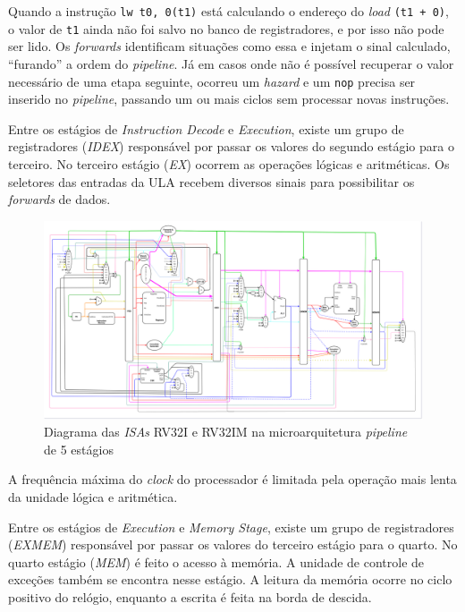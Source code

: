         { Quando a instrução \texttt{lw  t0, 0(t1)} está calculando o endereço
            do \textit{load} \texttt{(t1 + 0)}, o valor de \texttt{t1} ainda
            não foi salvo no banco de registradores, e por isso não pode ser
            lido. Os \textit{forwards} identificam situações como essa e injetam
            o sinal calculado, ``furando'' a ordem do \textit{pipeline}.
            Já em casos onde não é possível recuperar o valor necessário de uma
            etapa seguinte, ocorreu um \textit{hazard} e um \texttt{nop} precisa
            ser inserido no \textit{pipeline}, passando um ou mais ciclos sem
            processar novas instruções.
        }

        { Entre os estágios de \textit{Instruction Decode} e \textit{Execution},
            existe um grupo de registradores (\textit{IDEX}) responsável por passar
            os valores do segundo estágio para o terceiro. No terceiro estágio
            (\textit{EX}) ocorrem as operações lógicas e aritméticas.
            Os seletores das entradas da ULA recebem diversos sinais para
            possibilitar os \textit{forwards} de dados.
        }

        \begin{figure}[H]
        \centering
            \includegraphics[angle=90,width=1\textwidth,height=1\textheight,keepaspectratio]{../images/uarch_diagrams/pipeline-RV32I-RV32IM.png}
            \caption{Diagrama das \textit{ISAs} RV32I e RV32IM na microarquitetura
                \textit{pipeline} de 5 estágios}\label{fig:diagram_rv32i_pipe}
        \end{figure}

        { A frequência máxima do \textit{clock} do processador é limitada pela
            operação mais lenta da unidade lógica e aritmética.
        }

        { Entre os estágios de \textit{Execution} e \textit{Memory Stage},
            existe um grupo de registradores (\textit{EXMEM}) responsável por passar
            os valores do terceiro estágio para o quarto. No quarto estágio
            (\textit{MEM}) é feito o acesso à memória. A unidade
            de controle de exceções também se encontra nesse estágio. A leitura
            da memória ocorre no ciclo positivo do relógio, enquanto a escrita
            é feita na borda de descida.
        }

